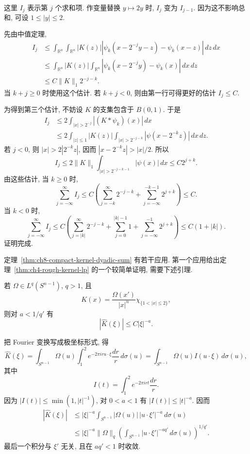 \begin{Proof}
\hypertarget{chapter-08-page-187}{}
这里 $I_j$ 表示第 $j$ 个求和项. 作变量替换 $y\mapsto2y$ 时, $I_j$ 变为 $I_{j-1}$. 因为这不影响总和, 可设 $1\le|y|\le2$.

先由中值定理,
\[
 \begin{aligned}
 I_j
 &\le\int_{\mathbb R^n}\int_{\mathbb R^n}|K(z)|
 |\psi_k(x-2^{-j}y-z)-\psi_k(x-z)|\,dz\,dx\\
 &\le\int_{\mathbb R^n}|K(z)|\int_{\mathbb R^n}
 |\psi_k(x-2^{-j}y)-\psi_k(x)|\,dx\,dz\\
 &\le C\|K\|_1 2^{-j-k}.
 \end{aligned}
\]
当 $k+j\ge0$ 时使用这个估计. 若 $k+j<0$, 则由第一行可得更好的估计 $I_j\le C$.

为得到第三个估计, 不妨设 $K$ 的支集包含于 $B(0,1)$. 于是
\[
 \begin{aligned}
 I_j
 &\le2\int_{|x|>2^{-j}}|(K*\psi_k)(x)|\,dx\\
 &\le2\int_{|z|\le1}|K(z)|\int_{|x|>2^{-j-k}}
 |\psi(x-2^{-k}z)|\,dx\,dz.
 \end{aligned}
\]
若 $j<0$, 则 $|x|>2|2^{-k}z|$, 因而 $|x-2^{-k}z|>|x|/2$. 所以
\[
 I_j\le2\|K\|_1\int_{|x|>2^{-j-k-1}}|\psi(x)|\,dx
 \le C2^{j+k}.
\]
由这些估计, 当 $k\ge0$ 时,
\[
 \sum_{j=-\infty}^{\infty}I_j
 \le C\left(\sum_{j=-k}^{\infty}2^{-j-k}
 +\sum_{j=-\infty}^{-k-1}2^{j+k}\right)\le C.
\]
当 $k<0$ 时,
\[
 \sum_{j=-\infty}^{\infty}I_j
 \le C\left(\sum_{j=|k|}^{\infty}2^{-j-k}
 +\sum_{j=0}^{|k|-1}1
 +\sum_{j=-\infty}^{-1}2^{j+k}\right)
 \le C(1+|k|).
\]
证明完成.
\end{Proof}

定理~\ref{thm:ch8-compact-kernel-dyadic-sum} 有若干应用. 第一个应用给出定理~\ref{thm:ch4-rough-kernel-lp} 的一个较简单证明, 需要下述引理.

\begin{Lemma}
\label{lem:ch8-annular-rough-kernel-decay}
若 $\Omega\in L^q(S^{n-1})$, $q>1$, 且
\[
 K(x)=\frac{\Omega(x')}{|x|^n}\chi_{\{1<|x|\le2\}},
\]
则对 $a<1/q'$ 有
\[
 |\widehat K(\xi)|\le C|\xi|^{-a}.
\]
\end{Lemma}

\hypertarget{chapter-08-page-188}{}
\begin{Proof}
把 Fourier 变换写成极坐标形式, 得
\[
 \widehat K(\xi)
 =\int_{S^{n-1}}\Omega(u)\int_1^2e^{-2\pi iru\cdot\xi}\frac{dr}{r}\,d\sigma(u)
 =\int_{S^{n-1}}\Omega(u)I(u\cdot\xi)\,d\sigma(u),
\]
其中
\[
 I(t)=\int_1^2e^{-2\pi irt}\frac{dr}{r}.
\]
因为 $|I(t)|\le\min(1,|t|^{-1})$, 对 $0<a<1$ 有 $|I(t)|\le|t|^{-a}$. 因而
\[
 \begin{aligned}
 |\widehat K(\xi)|
 &\le|\xi|^{-a}\int_{S^{n-1}}|\Omega(u)|\,|u\cdot\xi'|^{-a}\,d\sigma(u)\\
 &\le|\xi|^{-a}\|\Omega\|_q
 \left(\int_{S^{n-1}}|u\cdot\xi'|^{-aq'}\,d\sigma(u)\right)^{1/q'}.
 \end{aligned}
\]
最后一个积分与 $\xi'$ 无关, 且在 $aq'<1$ 时收敛.
\end{Proof}

